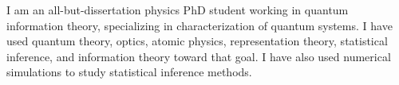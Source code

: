 

\begin{cvparagraph}

I am an all-but-dissertation physics PhD student working in quantum information theory, specializing in
characterization of quantum systems. I have used quantum theory, optics, atomic physics, representation theory, statistical inference, and information theory toward that goal. I have also used numerical simulations to study statistical inference methods.
\end{cvparagraph}
